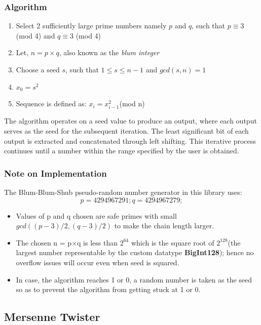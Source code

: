 \documentclass[titlepage, 11pt]{article}
\begin{document}
\subsubsection{Algorithm}
\begin{enumerate}
\item Select 2 sufficiently large prime numbers namely $p$ and $q$, such that          $p\equiv 3$ (mod 4) and $q\equiv 3$ (mod 4)
\item Let, $n=p\times q$, also known as the \textit{blum integer}
\item Choose a seed $s$, such that $1\leq s \leq n-1$ and $\textit{gcd}(s,n)=1$ 
\item $ x_{0}= s^{2}$
\item Sequence is defined as: $x_{i}={x^{2}_{i-1}}$(mod n)
\end{enumerate}

The algorithm operates on a seed value to produce an output, where each output serves as the seed for the subsequent iteration. The least significant bit of each output is extracted and concatenated through left shifting. This iterative process continues until a number within the range specified by the user is obtained.


\subsubsection{Note on Implementation}
The Blum-Blum-Shub pseudo-random number generator in this library uses:
$$p = 4294967291; q = 4294967279;$$

\begin{itemize}
\item Values of p and q chosen are  safe primes with small $gcd((p-3)/2, (q-3)/2)$ to make the chain length larger.
\item The chosen n = p$\times$q is less than $2^{64}$ which is the square root of $2^{128}$(the largest number representable by the custom datatype \textbf{BigInt128}); hence no overflow issues will occur even when seed is squared.
\item In case, the algorithm reaches 1 or 0, a random number is taken as the seed so as to prevent the algorithm from getting stuck at 1 or 0.
\end{itemize}

\subsection{Mersenne Twister}
\end{document}
